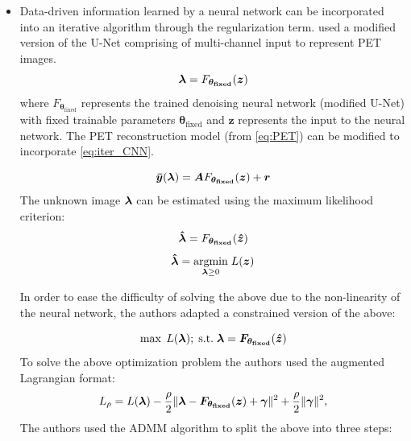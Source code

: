 \begin{itemize}


\item Data-driven information learned by a neural network can be incorporated into an iterative algorithm through the regularization term. \cite{gong2019iterative} used a modified version of the U-Net comprising of multi-channel input to represent \ac{PET} images.
\begin{equation}\label{eq:iter_CNN}
\bm{\lambda} = F_{\bm{\theta_{\mathrm{fixed}}}}(\bm{z})
\end{equation} 
where $F_{\bm{\theta_{\mathrm{fixed}}}}$ represents the trained denoising neural network (modified U-Net) with fixed trainable parameters $\bm{\theta_{\mathrm{fixed}}}$ and $\bm{z}$ represents the input to the neural network. The \ac{PET} reconstruction model (from \ref{eq:PET}) can be modified to incorporate \ref{eq:iter_CNN}. 

\begin{equation}\label{eq:mod_PET}
	\bm{\bar{y}}(\bm{\lambda}) = \bm{A} F_{\bm{\theta_{\mathrm{fixed}}}}(\bm{z}) + \bm{r}
\end{equation}
The unknown image $\bm{\lambda}$ can be estimated using the maximum likelihood criterion:
\begin{equation}\label{eq:iter_CNN2}
\bm{\hat{\lambda}} = F_{\bm{\theta_{\mathrm{fixed}}}}(\bm{\hat{z}})
\end{equation} 
\begin{equation}
\bm{\hat{\lambda}}=\underset{\bm{\lambda} \ge 0}{\operatorname{argmin}} \; L(\bm{z})
\end{equation}

In order to ease the difficulty of solving the above due to the non-linearity of the neural network, the authors adapted a constrained version of the above:

\begin{equation}\label{constr}
 	\operatorname{max} \; L(\bm{\bm{\lambda}});  \; \mathrm{s.t.} \; \bm{\lambda} = \bm{F}_{\bm{\theta_{\mathrm{fixed}}}}(\bm{\hat{z}})
\end{equation}
To solve the above optimization problem the authors used the augmented Lagrangian format:
\begin{equation}
L_{\rho}=L(\bm{\lambda})-\frac{\rho}{2}\|\bm{\lambda}-\bm{F}_{\bm{\theta_{\mathrm{fixed}}}}(\bm{z})+\bm{\gamma}\|^{2}+\frac{\rho}{2}\|\bm{\gamma}\|^{2},
\end{equation}
The authors used the \ac{ADMM} algorithm to split the above into three steps:


\end{itemize}
